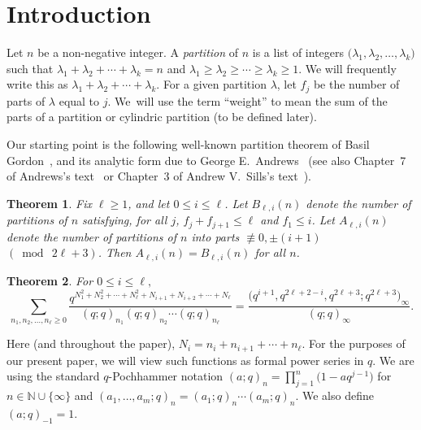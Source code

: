 \documentclass[pdftex]{sigma}
\numberwithin{equation}{section}
\newtheorem{Theorem}{Theorem}[section]
\theoremstyle{definition}
\newcommand{\NN}{\mathbb{N}}
\begin{document}
\renewcommand{\thefootnote}{\arabic{footnote}}
\setcounter{footnote}{0}

\section{Introduction}

Let $n$ be a non-negative integer. A {\it partition} of $n$ is a list of integers $\bigl(\lambda_1,\lambda_2,\dots,\lambda_k\bigr)$ such that $ \lambda_1+\lambda_2+\cdots+\lambda_k = n$ and $\lambda_1 \ge \lambda_2 \ge \cdots \ge \lambda_k \ge 1$. We will frequently write this as $\lambda_1+\lambda_2+\cdots+\lambda_k$. For a given partition $\lambda$, let $f_j$ be the number of parts of $\lambda$ equal to $j$. We~will use the term ``weight'' to mean the sum of the parts of a partition or cylindric partition (to be defined later).

Our starting point is the following well-known partition theorem of Basil Gordon~\cite{Gord}, and its analytic form due to George E.~Andrews~\cite{And66} (see also Chapter~7 of Andrews's text~\cite{And-book} or Chapter~3 of Andrew V.~Sills's text~\cite{Sil-book}).

\begin{Theorem} \label{thm:Gordon}
Fix $\ell\ge 1$, and let $0\le i\le \ell$. Let $B_{\ell,i}(n)$ denote the number of partitions of $n$ satisfying, for all $j$, $f_j + f_{j+1}\le \ell$ and $f_1 \le i$. Let $A_{\ell,i}(n)$ denote the number of partitions of $n$ into parts $\not\equiv 0, \pm (i+1)$ $(\bmod~2\ell+3)$. Then $A_{\ell,i}(n)=B_{\ell,i}(n)$ for all $n$.
\end{Theorem}

\begin{Theorem} \label{thm:AndGor}
For $0\le i \le \ell,$
\begin{equation*}
\sum_{n_1,n_2,\dots,n_{\ell}\ge 0} \frac{q^{N_1^2+N_2^2+\cdots+N_{\ell}^2+N_{i+1}+N_{i+2}+\cdots+N_{\ell}}}{(q;q)_{n_1}(q;q)_{n_2}\cdots(q;q)_{n_{\ell}}} = \frac{\bigl(q^{i+1},q^{2\ell+2-i},q^{2\ell+3};q^{2\ell+3}\bigr)_\infty}{(q;q)_\infty}.
\end{equation*}
\end{Theorem}
Here (and throughout the paper), $N_i = n_i +n_{i+1}+\cdots+n_{\ell}$. For the purposes of our present paper, we will view such functions as formal power series in $q$. We are using the standard $q$-Pochhammer notation
$(a;q)_n = \prod_{j=1}^n \bigl(1-aq^{j-1}\bigr)$ for $n \in \NN \cup \{\infty\}$ and $(a_1,\dots,a_m;q)_n=(a_1;q)_n\cdots(a_m;q)_n$. We also define $(a;q)_{-1}=1$.
\end{document}
